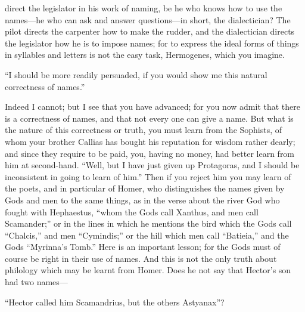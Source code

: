 \documentclass[11pt,letter]{article}
\begin{document}
direct the legislator in his work of naming, be he who knows how to use the names—he who can ask and answer questions—in short, the dialectician? The pilot directs the carpenter how to make the rudder, and the dialectician directs the legislator how he is to impose names; for to express the ideal forms of things in syllables and letters is not the easy task, Hermogenes, which you imagine.

\par  “I should be more readily persuaded, if you would show me this natural correctness of names.”

\par  Indeed I cannot; but I see that you have advanced; for you now admit that there is a correctness of names, and that not every one can give a name. But what is the nature of this correctness or truth, you must learn from the Sophists, of whom your brother Callias has bought his reputation for wisdom rather dearly; and since they require to be paid, you, having no money, had better learn from him at second-hand. “Well, but I have just given up Protagoras, and I should be inconsistent in going to learn of him.” Then if you reject him you may learn of the poets, and in particular of Homer, who distinguishes the names given by Gods and men to the same things, as in the verse about the river God who fought with Hephaestus, “whom the Gods call Xanthus, and men call Scamander;” or in the lines in which he mentions the bird which the Gods call “Chalcis,” and men “Cymindis;” or the hill which men call “Batieia,” and the Gods “Myrinna’s Tomb.” Here is an important lesson; for the Gods must of course be right in their use of names. And this is not the only truth about philology which may be learnt from Homer. Does he not say that Hector’s son had two names—

\par  “Hector called him Scamandrius, but the others Astyanax”?
\end{document}
